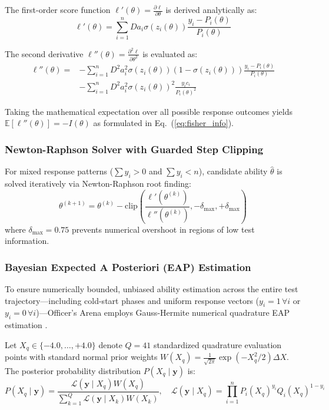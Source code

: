 \documentclass[conference]{IEEEtran}
\begin{document}
The first-order score function $\ell'(\theta) = \frac{\partial \ell}{\partial \theta}$ is derived analytically as:
\begin{equation}
    \ell'(\theta) = \sum_{i=1}^n D a_i \sigma(z_i(\theta)) \frac{y_i - P_i(\theta)}{P_i(\theta)}
    \label{eq:score_function}
\end{equation}

The second derivative $\ell''(\theta) = \frac{\partial^2 \ell}{\partial \theta^2}$ is evaluated as:
\begin{align}
    \ell''(\theta) = &-\sum_{i=1}^n D^2 a_i^2 \sigma(z_i(\theta)) (1 - \sigma(z_i(\theta))) \frac{y_i - P_i(\theta)}{P_i(\theta)} \nonumber \\
    &-\sum_{i=1}^n D^2 a_i^2 \sigma(z_i(\theta))^2 \frac{y_i c_i}{P_i(\theta)^2}
    \label{eq:hessian_function}
\end{align}

Taking the mathematical expectation over all possible response outcomes yields $\mathbb{E}[\ell''(\theta)] = -I(\theta)$ as formulated in Eq.~(\ref{eq:fisher_info}).

\subsubsection{Newton-Raphson Solver with Guarded Step Clipping}
For mixed response patterns ($\sum y_i > 0$ and $\sum y_i < n$), candidate ability $\hat{\theta}$ is solved iteratively via Newton-Raphson root finding:
\begin{equation}
    \theta^{(k+1)} = \theta^{(k)} - \text{clip}\left( \frac{\ell'(\theta^{(k)})}{\ell''(\theta^{(k)})}, -\delta_{\max}, +\delta_{\max} \right)
    \label{eq:newton_raphson}
\end{equation}
where $\delta_{\max} = 0.75$ prevents numerical overshoot in regions of low test information.

\subsubsection{Bayesian Expected A Posteriori (EAP) Estimation}
To ensure numerically bounded, unbiased ability estimation across the entire test trajectory---including cold-start phases and uniform response vectors ($y_i = 1 \, \forall i$ or $y_i = 0 \, \forall i$)---Officer's Arena employs Gauss-Hermite numerical quadrature EAP estimation \cite{BockMislevy1982}.

Let $X_q \in \{-4.0, \dots, +4.0\}$ denote $Q = 41$ standardized quadrature evaluation points with standard normal prior weights $W(X_q) = \frac{1}{\sqrt{2\pi}} \exp(-X_q^2 / 2) \Delta X$. The posterior probability distribution $P(X_q \mid \mathbf{y})$ is:
\begin{equation}
    P(X_q \mid \mathbf{y}) = \frac{\mathcal{L}(\mathbf{y} \mid X_q) W(X_q)}{\sum_{k=1}^Q \mathcal{L}(\mathbf{y} \mid X_k) W(X_k)}, \quad \mathcal{L}(\mathbf{y} \mid X_q) = \prod_{i=1}^n P_i(X_q)^{y_i} Q_i(X_q)^{1 - y_i}
    \label{eq:eap_posterior}
\end{equation}
\end{document}
